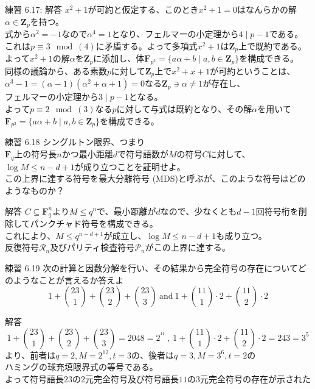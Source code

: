 \documentclass[dvipdfmx,10pt,jsarticle]{beamer}
\begin{document}
  \begin{frame}{練習 6.17: 解答}
    $x^2 + 1$が可約と仮定する、このとき$x^2+ 1 = 0$はなんらかの解$\alpha \in \mathbf{Z}_p$を持つ。\\
    式から$\alpha^2 = -1 $なので$\alpha^4 = 1$となり、フェルマーの小定理から$4 \mid p-1$である。\\
    これは$p \equiv 3 \mod (4)$に矛盾する。よって多項式$x^2 + 1$は$\mathbf{Z}_p$上で既約である。 \\
    よって$x^2 + 1$の解$\alpha$を$\mathbf{Z}_p$に添加し、体$\mathbf{F}_{p^2} = \lbrace a \alpha + b \mid a, b \in \mathbf{Z}_p \rbrace$を構成できる。 \\
    同様の議論から、ある素数$p$に対して$\mathbf{Z}_p$上で$x^2 + x + 1$が可約ということは、$\alpha^3 - 1 = (\alpha - 1)(\alpha^2 + \alpha + 1) = 0$なる$\mathbf{Z}_p \ni \alpha \neq 1$が存在し、\\
    フェルマーの小定理から$3 \mid p - 1$となる。\\
    よって$p \equiv 2 \mod (3)$なる$p$に対して与式は既約となり、その解$\alpha$を用いて$\mathbf{F}_{p^2} = \lbrace a \alpha + b \mid a, b \in \mathbf{Z}_p \rbrace$を構成できる。
  \end{frame}

  \begin{frame}{練習 6.18}
    シングルトン限界、つまり\\
    $\mathbf{F}_q$上の符号長$n$かつ最小距離$d$で符号語数が$M$の符号$C$に対して、$\log M \leq n - d + 1$が成り立つことを証明せよ。\\
    この上界に達する符号を最大分離符号 (MDS)と呼ぶが、このような符号はどのようなものか？
    \begin{block}{解答}
      $C \subseteq \mathbf{F}_q^n$より$M \leq q^n$で、最小距離が$d$なので、少なくとも$d - 1$回符号桁を削除してパンクチャド符号を構成できる。\\
      これにより、$M \leq q^{n - d + 1}$が成立し、$\log M \leq n - d + 1$も成り立つ。 \\
      反復符号$\mathcal{R}_n$及びパリティ検査符号$\mathcal{P}_n$がこの上界に達する。
    \end{block}
  \end{frame}

  \begin{frame}{練習 6.19}
    次の計算と因数分解を行い、その結果から完全符号の存在についてどのようなことが言えるか答えよ
    \[ 1 + \binom{23}{1} + \binom{23}{2} + \binom{23}{3} \  \text{and} \  1 + \binom{11}{1}\cdot 2 + \binom{11}{2} \cdot 2\]
    \begin{block}{解答}
      \[1 + \binom{23}{1} + \binom{23}{2} + \binom{23}{3} = 2048 = 2^{^{11}} \ , \ 1 + \binom{11}{1}\cdot 2 + \binom{11}{2} \cdot 2 = 243 =  3^5\]
      より、前者は$q = 2, M = 2^{12}, t = 3$の、後者は$q = 3, M = 3^6, t = 2$の\\ハミングの球充填限界式の等号である。\\
      よって符号語長$23$の2元完全符号及び符号語長$11$の3元完全符号の存在が示された
    \end{block}
  \end{frame}
\end{document}
